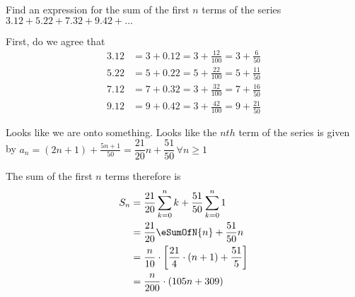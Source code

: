 
%
%
%
%
% 
% 

\question[4] Find an expression for the sum of the first $n$ terms of the series 
$3.12 + 5.22 + 7.32 + 9.42 + \ldots$


\ifprintanswers
\fi 

\begin{solution}[\halfpage]
	First, do we agree that
	\begin{align}
		3.12 &= 3 + 0.12 = 3 + \frac{12}{100} = 3 + \frac{6}{50} \\
		5.22 &= 5 + 0.22 = 5 + \frac{22}{100} = 5 + \frac{11}{50} \\
		7.12 &= 7 + 0.32 = 3 + \frac{32}{100} = 7 + \frac{16}{50} \\
		9.12 &= 9 + 0.42 = 3 + \frac{42}{100} = 9 + \frac{21}{50}
	\end{align}
	
	Looks like we are onto something. Looks like the $nth$ term of the series
	is given by $a_n = (2n+1) + \frac{5n+1}{50} = \dfrac{21}{20}n + \dfrac{51}{50}\, \forall n \geq 1$
	
	The sum of the first $n$ terms therefore is
	\begin{align}
		S_n &= \dfrac{21}{20}\sum_{k=0}^{n}k + \dfrac{51}{50}\sum_{k=0}^{n}1 \\
		&= \dfrac{21}{20}\eSumOfN{n} + \dfrac{51}{50}n \\
		&= \dfrac{n}{10}\cdot\left[ \dfrac{21}{4}\cdot(n+1) + \dfrac{51}{5}\right] \\
		&= \dfrac{n}{200}\cdot(105n + 309)
	\end{align}
\end{solution}
